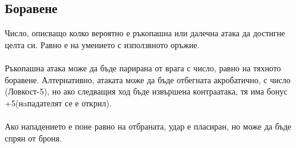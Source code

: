 \begin{multicols}{2}
\subsection{Боравене}
Число, описващо колко вероятно е ръкопашна или далечна атака да достигне целта си.
Равно е на умението с използвното оръжие.
\\
\\
Ръкопашна атака може да бъде парирана от врага с число, равно на тяхното боравене.
Алтернативно, атаката може да бъде отбегната акробатично, с число (Ловкост-5), но ако следващия ход бъде извършена контраатака, тя има бонус +5(нaпадателят се е открил).
\\
\\
Ако нападението е поне равно на отбраната, удар е пласиран, но може да бъде спрян от броня.



\end{multicols}
